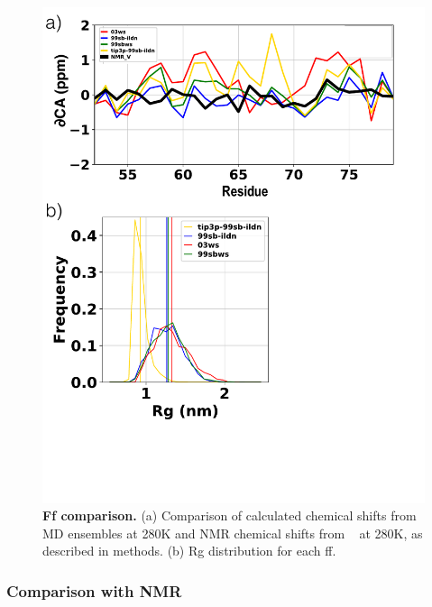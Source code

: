 \documentclass[journal=jacsat,manuscript=article]{achemso}
\begin{document}
 \begin{figure}[!ht]
\includegraphics[scale=0.5,width=\textwidth,trim={0 0cm 0 0cm},clip]{../figures/S1.pdf}
\caption{{\bf Ff comparison.} (a) Comparison of calculated chemical shifts from MD ensembles at 280K and NMR chemical shifts from ~\cite{Anastasia2013}  at 280K,  as described in methods. (b) Rg distribution for each ff.}
\label{S1} 
\end{figure}


\subsubsection*{Comparison with NMR}
\end{document}
